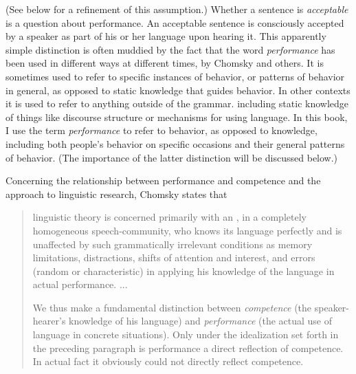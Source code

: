  (See below for a refinement of this assumption.) Whether a sentence is \textit{acceptable} is a question about performance. An acceptable sentence is consciously accepted by a speaker as part of his or her language upon hearing it. This apparently simple distinction is often muddied by the fact that the word \textit{performance} has been used in different ways at different times, by Chomsky and others. It is sometimes used to refer to specific instances of behavior, or patterns of behavior in general, as opposed to static knowledge that guides behavior. In other contexts it is used to refer to anything outside of the grammar. including static knowledge of things like discourse structure or mechanisms for using language. In this book, I use the term \textit{performance} to refer to behavior, as opposed to knowledge, including both people's behavior on specific
occasions and their general patterns of behavior. (The importance of the latter distinction will be discussed below.)

Concerning the relationship between performance and competence and the approach to linguistic research, Chomsky states that

\begin{quote}
linguistic theory is concerned primarily with an , in a completely homogeneous speech-community, who knows its language perfectly and is unaffected by such grammatically irrelevant conditions as memory limitations, distractions, shifts of attention and interest, and errors (random or characteristic) in applying his knowledge of the language in actual performance. ...

We thus make a fundamental distinction between \textit{competence} (the speaker-hearer's knowledge of his language) and \textit{performance} (the actual use of language in concrete situations). Only under the idealization set forth in the preceding paragraph is performance a direct reflection of competence. In actual fact it obviously could not directly reflect competence. \citep[3\textendash{}4]{Chomsky1965}
\end{quote}

